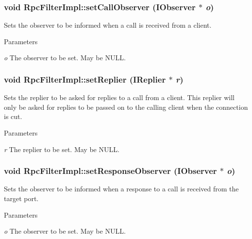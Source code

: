 \hypertarget{classyarp_1_1os_1_1impl_1_1_rpc_filter_impl_aeca9c8a9d37355dd222a825bdb121c35}{
\subsubsection[{setCallObserver}]{\setlength{\rightskip}{0pt plus 5cm}void RpcFilterImpl::setCallObserver ({\bf IObserver} $\ast$ {\em o})}}
\label{classyarp_1_1os_1_1impl_1_1_rpc_filter_impl_aeca9c8a9d37355dd222a825bdb121c35}
Sets the observer to be informed when a call is received from a client. 
\begin{DoxyParams}{Parameters}
\item[{\em o}]The observer to be set. May be {\ttfamily NULL}. \end{DoxyParams}
\hypertarget{classyarp_1_1os_1_1impl_1_1_rpc_filter_impl_aa7595e915624ac4c6126919c00761a23}{
\subsubsection[{setReplier}]{\setlength{\rightskip}{0pt plus 5cm}void RpcFilterImpl::setReplier ({\bf IReplier} $\ast$ {\em r})}}
\label{classyarp_1_1os_1_1impl_1_1_rpc_filter_impl_aa7595e915624ac4c6126919c00761a23}
Sets the replier to be asked for replies to a call from a client. This replier will only be asked for replies to be passed on to the calling client when the connection is cut. 
\begin{DoxyParams}{Parameters}
\item[{\em r}]The replier to be set. May be {\ttfamily NULL}. \end{DoxyParams}
\hypertarget{classyarp_1_1os_1_1impl_1_1_rpc_filter_impl_af31c769d6b5e50170d080aea6aa650c5}{
\subsubsection[{setResponseObserver}]{\setlength{\rightskip}{0pt plus 5cm}void RpcFilterImpl::setResponseObserver ({\bf IObserver} $\ast$ {\em o})}}
\label{classyarp_1_1os_1_1impl_1_1_rpc_filter_impl_af31c769d6b5e50170d080aea6aa650c5}
Sets the observer to be informed when a response to a call is received from the target port. 
\begin{DoxyParams}{Parameters}
\item[{\em o}]The observer to be set. May be {\ttfamily NULL}. \end{DoxyParams}


